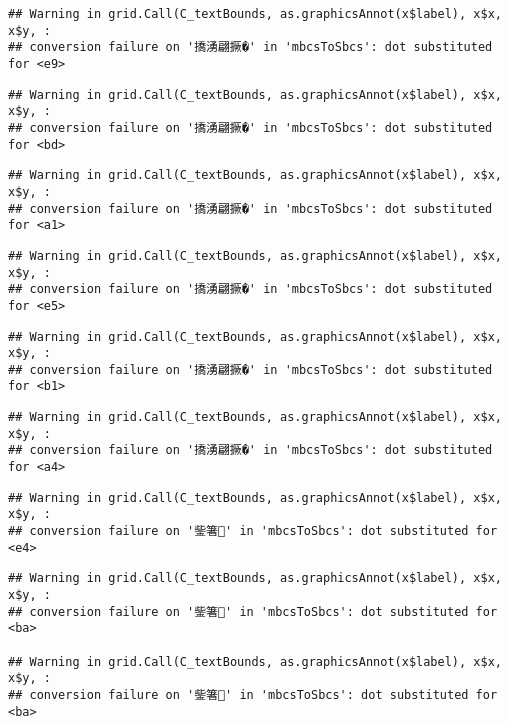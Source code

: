 \documentclass[
]{article}
\begin{document}
\begin{verbatim}
## Warning in grid.Call(C_textBounds, as.graphicsAnnot(x$label), x$x, x$y, :
## conversion failure on '撟湧翩撅�' in 'mbcsToSbcs': dot substituted for <e9>
\end{verbatim}

\begin{verbatim}
## Warning in grid.Call(C_textBounds, as.graphicsAnnot(x$label), x$x, x$y, :
## conversion failure on '撟湧翩撅�' in 'mbcsToSbcs': dot substituted for <bd>
\end{verbatim}

\begin{verbatim}
## Warning in grid.Call(C_textBounds, as.graphicsAnnot(x$label), x$x, x$y, :
## conversion failure on '撟湧翩撅�' in 'mbcsToSbcs': dot substituted for <a1>
\end{verbatim}

\begin{verbatim}
## Warning in grid.Call(C_textBounds, as.graphicsAnnot(x$label), x$x, x$y, :
## conversion failure on '撟湧翩撅�' in 'mbcsToSbcs': dot substituted for <e5>
\end{verbatim}

\begin{verbatim}
## Warning in grid.Call(C_textBounds, as.graphicsAnnot(x$label), x$x, x$y, :
## conversion failure on '撟湧翩撅�' in 'mbcsToSbcs': dot substituted for <b1>
\end{verbatim}

\begin{verbatim}
## Warning in grid.Call(C_textBounds, as.graphicsAnnot(x$label), x$x, x$y, :
## conversion failure on '撟湧翩撅�' in 'mbcsToSbcs': dot substituted for <a4>
\end{verbatim}

\begin{verbatim}
## Warning in grid.Call(C_textBounds, as.graphicsAnnot(x$label), x$x, x$y, :
## conversion failure on '鈭箸' in 'mbcsToSbcs': dot substituted for <e4>
\end{verbatim}

\begin{verbatim}
## Warning in grid.Call(C_textBounds, as.graphicsAnnot(x$label), x$x, x$y, :
## conversion failure on '鈭箸' in 'mbcsToSbcs': dot substituted for <ba>

## Warning in grid.Call(C_textBounds, as.graphicsAnnot(x$label), x$x, x$y, :
## conversion failure on '鈭箸' in 'mbcsToSbcs': dot substituted for <ba>
\end{verbatim}
\end{document}
